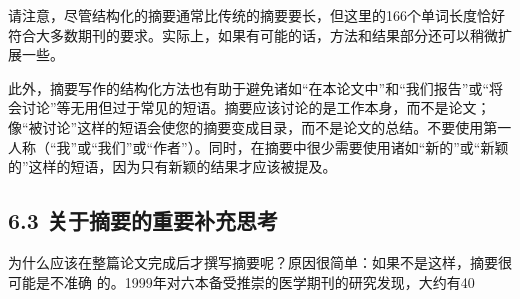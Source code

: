 请注意，尽管结构化的摘要通常比传统的摘要要长，但这里的166个单词长度恰好符合大多数期刊的要求。实际上，如果有可能的话，方法和结果部分还可以稍微扩展一些。

此外，摘要写作的结构化方法也有助于避免诸如“在本论文中”和“我们报告”或“将会讨论”等无用但过于常见的短语。摘要应该讨论的是工作本身，而不是论文；像“被讨论”这样的短语会使您的摘要变成目录，而不是论文的总结。不要使用第一人称（“我”或“我们”或“作者”）。同时，在摘要中很少需要使用诸如“新的”或“新颖的”这样的短语，因为只有新颖的结果才应该被提及。

\subsection*{6.3 关于摘要的重要补充思考}
为什么应该在整篇论文完成后才撰写摘要呢？原因很简单：如果不是这样，摘要很可能是不准确 的。1999年对六本备受推崇的医学期刊的研究发现，大约有40%

